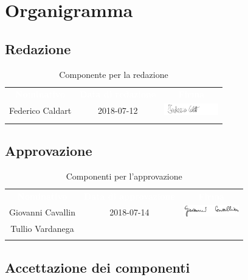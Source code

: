 \newpage
\renewcommand{\arraystretch}{1}

\section{Organigramma}

\subsection{Redazione}
\begin{longtable}{ c  c  c }
	\rowcolor{bluSOS}
	\textcolor{white}{\textbf{Nominativo}} & \textcolor{white}{\textbf{Data di redazione}} & \textcolor{white}{\textbf{Firma}}\\
	
	Federico Caldart & 2018-07-12 & \includegraphics[height=0.5cm]{img/Firme/FedericoCaldart.png}\\
	\caption{Componente per la redazione}  \\
\end{longtable}

\subsection{Approvazione}
\begin{longtable}{ c  c  c }
	\rowcolor{bluSOS}
	\textcolor{white}{\textbf{Nominativo}} & \textcolor{white}{\textbf{Data di approvazione}} & \textcolor{white}{\textbf{Firma}}\\
	
	Giovanni Cavallin & 2018-07-14 & \includegraphics[height=0.5cm]{img/Firme/GiovanniCavallin.png}  \\
	Tullio Vardanega & & \\
	\rowcolor{white}\caption{Componenti per l'approvazione}\\
\end{longtable}

\subsection{Accettazione dei componenti}

